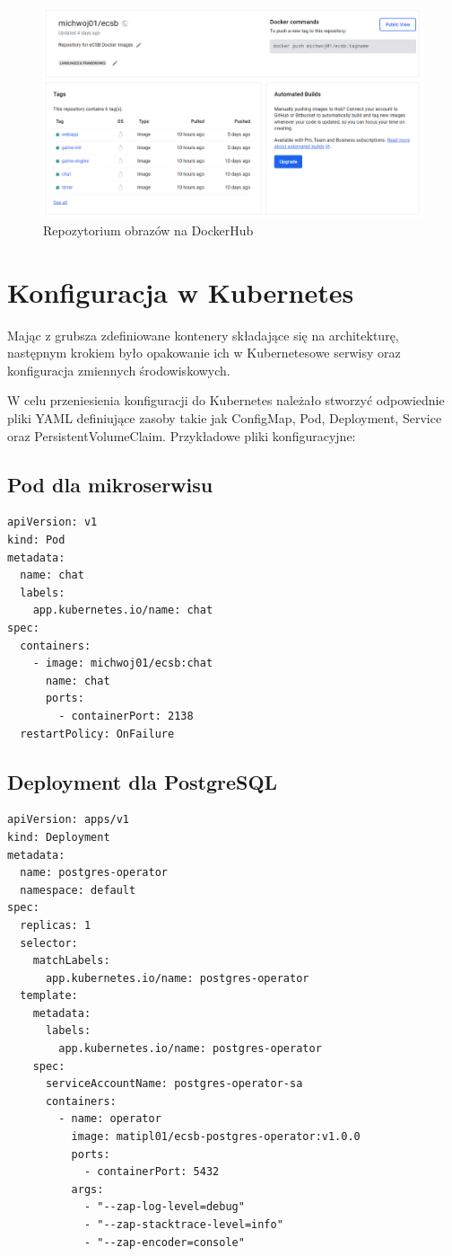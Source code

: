 \documentclass[polish]{aghengthesis}
\begin{document}
\begin{figure}[!htbp]
    \centering
    \includegraphics[width=0.9\linewidth]{resources/docker_hub.PNG}
    \caption{Repozytorium obrazów na DockerHub}
    \label{fig:dockerhub}
\end{figure}

\section{Konfiguracja w Kubernetes}
Mając z grubsza zdefiniowane kontenery składające się na architekturę, następnym krokiem było opakowanie ich w Kubernetesowe serwisy oraz konfiguracja zmiennych środowiskowych. 

W celu przeniesienia konfiguracji do Kubernetes należało stworzyć odpowiednie pliki YAML definiujące zasoby takie jak ConfigMap, Pod, Deployment, Service oraz PersistentVolumeClaim. Przykładowe pliki konfiguracyjne:

\subsection{Pod dla mikroserwisu}

\begin{lstlisting}[caption=Pod dla mikroserwisu]
apiVersion: v1
kind: Pod
metadata:
  name: chat
  labels:
    app.kubernetes.io/name: chat
spec:
  containers:
    - image: michwoj01/ecsb:chat
      name: chat
      ports:
        - containerPort: 2138
  restartPolicy: OnFailure
\end{lstlisting}

\subsection{Deployment dla PostgreSQL}

\begin{lstlisting}[caption=Deployment dla PostgreSQL]
apiVersion: apps/v1
kind: Deployment
metadata:
  name: postgres-operator
  namespace: default
spec:
  replicas: 1
  selector:
    matchLabels:
      app.kubernetes.io/name: postgres-operator
  template:
    metadata:
      labels:
        app.kubernetes.io/name: postgres-operator
    spec:
      serviceAccountName: postgres-operator-sa
      containers:
        - name: operator
          image: matipl01/ecsb-postgres-operator:v1.0.0
          ports:
            - containerPort: 5432
          args:
            - "--zap-log-level=debug"
            - "--zap-stacktrace-level=info"
            - "--zap-encoder=console"
\end{lstlisting}
\end{document}
